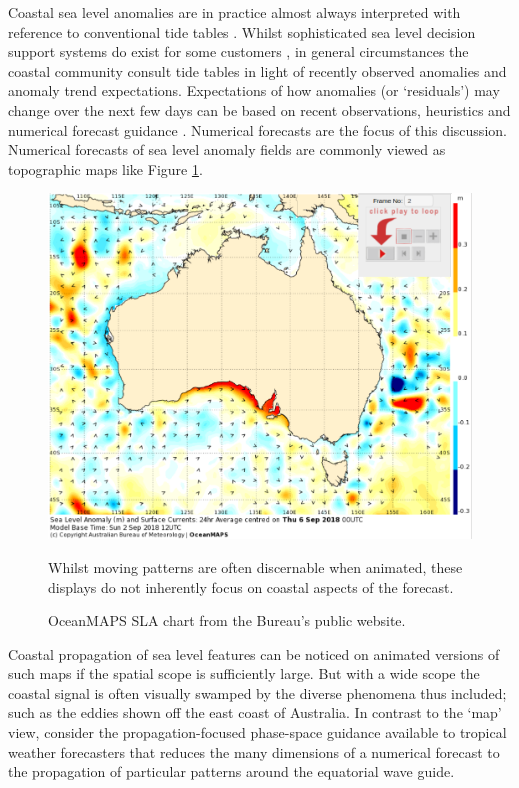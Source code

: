 Coastal sea level anomalies are in practice almost always interpreted with reference to conventional tide tables \citep{PCTMSL-sp9}.
Whilst sophisticated sea level decision support systems do exist for some customers \citep{James:2017gj}, in general circumstances the coastal community consult tide tables in light of recently observed anomalies and anomaly trend expectations.
Expectations of how anomalies (or `residuals') may change over the next few days can be based on recent observations, heuristics and numerical forecast guidance \citep{Taylor:2017coa, Horsburgh:2011th}.   Numerical forecasts are the focus of this discussion.
Numerical forecasts of sea level anomaly fields are commonly viewed as topographic maps like Figure \ref{fig:oldcharts}.
\begin{figure}[!hbt] \centering
    \includegraphics[width=\figwidthBig]{figures/maps/omaps_chart_anim_eg.png}
    \caption{OceanMAPS SLA chart from the Bureau's public website.}
    {Whilst moving patterns are often discernable when animated, these displays do not inherently focus on coastal aspects of the forecast.  \protect\citep{urlBOM_SLA:2018} }
    \label{fig:oldcharts}
\end{figure}  
Coastal propagation of sea level features can be noticed on animated versions of such maps if the spatial scope is sufficiently large.
But with a wide scope the coastal signal is often visually swamped by the diverse phenomena thus included; such as the eddies shown off the east coast of Australia.
In contrast to the `map' view, consider the propagation-focused phase-space guidance available to tropical weather forecasters \citep{Wheeler:2001} that reduces the many dimensions of a numerical forecast to the propagation of particular patterns around the equatorial wave guide.

